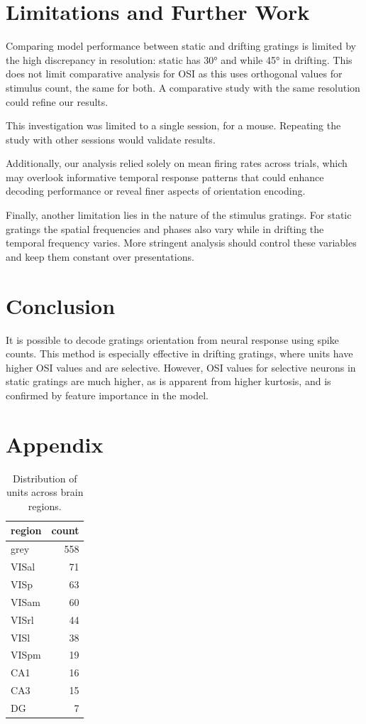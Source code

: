 \documentclass[10pt,twocolumn]{article}
\begin{document}
\section{Limitations and Further Work}

Comparing model performance between static and drifting gratings is limited by the high discrepancy in resolution: static has 30° and while 45° in drifting. This does not limit comparative analysis for OSI as this uses orthogonal values for stimulus count, the same for both. A comparative study with the same resolution could refine our results.

This investigation was limited to a single session, for a mouse. Repeating the study with other sessions would validate results.

Additionally, our analysis relied solely on mean firing rates across trials, which may overlook informative temporal response patterns that could enhance decoding performance or reveal finer aspects of orientation encoding.

Finally, another limitation lies in the nature of the stimulus gratings. For static gratings the spatial frequencies and phases also vary while in drifting the temporal frequency varies. More stringent analysis should control these variables and keep them constant over presentations. 

\section{Conclusion}

It is possible to decode gratings orientation from neural response using spike counts. This method is especially effective in drifting gratings, where units have higher OSI values and are selective. However, OSI values for selective neurons in static gratings are much higher, as is apparent from higher kurtosis, and is confirmed by feature importance in the model.

\newpage

\appendix

\section{Appendix}

\begin{table}[H]
\centering
\begin{tabular}{lr}
\toprule
region & count \\
\midrule
grey   & 558 \\
VISal  &  71 \\
VISp   &  63 \\
VISam  &  60 \\
VISrl  &  44 \\
VISl   &  38 \\
VISpm  &  19 \\
CA1    &  16 \\
CA3    &  15 \\
DG     &   7 \\
\bottomrule
\end{tabular}
\caption{Distribution of units across brain regions.}
\label{tab:regions}
\end{table}
\end{document}
